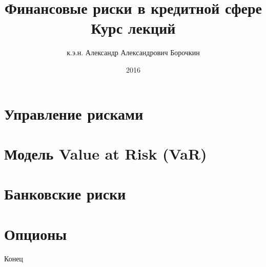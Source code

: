 \documentclass{beamer}
\title[Финансовые риски в кредитной сфере]{Финансовые риски в кредитной сфере\\Курс лекций}
\author{к.э.н. Александр Александрович Борочкин}
\institute{Нижегородский государственный университет}
\date{2016}
\begin{document}
\begin{frame}
\titlepage
\end{frame}

%


\section{Управление рисками}


\section{Модель Value at Risk (VaR)}
%


\section{Банковские риски}


\section{Опционы}


\begin{frame}
\begin{center}
\huge{Конец}
\end{center}
\end{frame}
\end{document}
